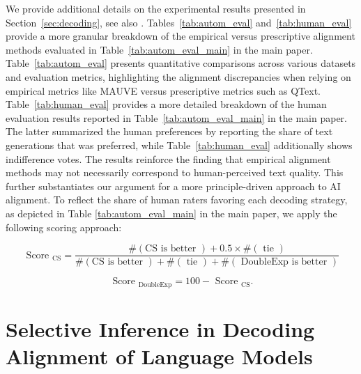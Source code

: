 \documentclass{article}
\theoremstyle{plain}
\theoremstyle{definition}
\theoremstyle{remark}
\begin{document}
We provide additional details on the experimental results presented in Section~\ref{sec:decoding}, see also \citet{garces-arias-etal-2024-adaptive,garces-arias-etal-2025-decoding}.
%
Tables~\ref{tab:autom_eval} and~\ref{tab:human_eval} provide a more granular breakdown of the empirical versus prescriptive alignment methods evaluated in Table~\ref{tab:autom_eval_main} in the main paper. Table~\ref{tab:autom_eval} presents quantitative comparisons across various datasets and evaluation metrics, highlighting the alignment discrepancies when relying on empirical metrics like MAUVE versus prescriptive metrics such as QText. Table~\ref{tab:human_eval} provides a more detailed breakdown of the human evaluation results reported in Table~\ref{tab:autom_eval_main} in the main paper. The latter summarized the human preferences by reporting the share of text generations that was preferred, while Table~\ref{tab:human_eval} additionally shows indifference votes. 
%
The results reinforce the finding that empirical alignment methods may not necessarily correspond to human-perceived text quality. This further substantiates our argument for a more principle-driven approach to AI alignment. 
%
To reflect the share of human raters favoring each decoding strategy, as depicted in Table \ref{tab:autom_eval_main} in the main paper, we apply the following scoring approach:

$$
\text { Score }_{\mathrm{CS}}=\frac{\#(\mathrm{CS} \text { is better })+0.5 \times \#(\text { tie })}{\#(\mathrm{CS} \text { is better })+\#(\text { tie })+\#(\text { DoubleExp is better })} 
$$

$$
\text { Score }_{\mathrm{DoubleExp}}= 100 - \text { Score }_{\mathrm{CS}}.
$$





\section{Selective Inference in Decoding Alignment of Language Models} \label{app_sel-inference}
\end{document}
